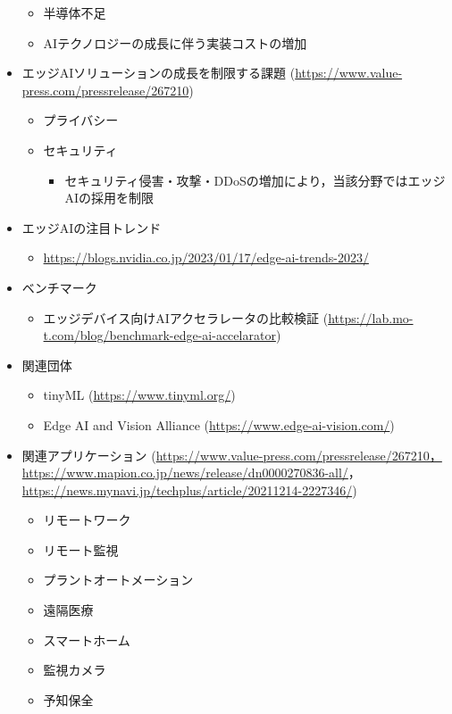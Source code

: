\begin{itemize}
	\begin{itemize}
		\item 半導体不足
		\item AIテクノロジーの成長に伴う実装コストの増加
	\end{itemize}
	\item エッジAIソリューションの成長を制限する課題 (\url{https://www.value-press.com/pressrelease/267210})
	\begin{itemize}
		\item プライバシー
		\item セキュリティ
		\begin{itemize}
			\item セキュリティ侵害・攻撃・DDoSの増加により，当該分野ではエッジAIの採用を制限
		\end{itemize}
	\end{itemize}
	\item エッジAIの注目トレンド
	\begin{itemize}
		\item \url{https://blogs.nvidia.co.jp/2023/01/17/edge-ai-trends-2023/}
	\end{itemize}
	\item ベンチマーク
	\begin{itemize}
		\item エッジデバイス向けAIアクセラレータの比較検証 (\url{https://lab.mo-t.com/blog/benchmark-edge-ai-accelarator})
	\end{itemize}
	\item 関連団体
	\begin{itemize}
		\item tinyML (\url{https://www.tinyml.org/})
		\item Edge AI and Vision Alliance (\url{https://www.edge-ai-vision.com/})
	\end{itemize}
	\item 関連アプリケーション (\url{https://www.value-press.com/pressrelease/267210，https://www.mapion.co.jp/news/release/dn0000270836-all/}，\url{https://news.mynavi.jp/techplus/article/20211214-2227346/})
	\begin{itemize}
		\item リモートワーク
		\item リモート監視
		\item プラントオートメーション
		\item 遠隔医療
		\item スマートホーム
		\item 監視カメラ
		\item 予知保全

\end{itemize}
\end{itemize}

